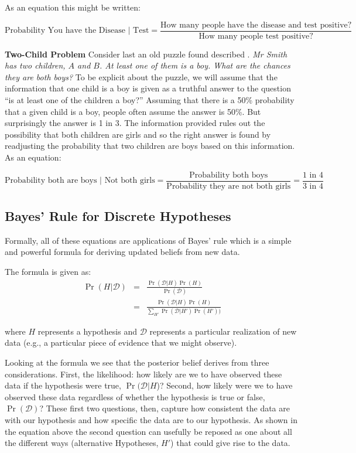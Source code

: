 \documentclass[
  12pt,
]{book}
\begin{document}
As an equation this might be written:

\[\text{Probability You have the Disease | Test} = \frac{\text{How many people have the disease and test positive?}}{\text{How many people test positive?}} \]

\textbf{Two-Child Problem} Consider last an old puzzle found described \citet{gardner1961second}. \emph{Mr Smith has two children, \(A\) and \(B\). At least one of them is a boy. What are the chances they are both boys?}
To be explicit about the puzzle, we will assume that the information that one child is a boy is given as a truthful answer to the question ``is at least one of the children a boy?'' Assuming that there is a 50\% probability that a given child is a boy, people often assume the answer is 50\%. But surprisingly the answer is 1 in 3. The information provided rules out the possibility that both children are girls and so the right answer is found by readjusting the probability that two children are boys based on this information. As an equation:

\[\text{Probability both are boys | Not both girls} = \frac{\text{Probability  both boys}}{\text{Probability they are not both girls}} = \frac{\text{1 in 4}}{\text{3 in 4}}\]

\hypertarget{bayes-rule-for-discrete-hypotheses}{%
\subsection{Bayes' Rule for Discrete Hypotheses}\label{bayes-rule-for-discrete-hypotheses}}

Formally, all of these equations are applications of Bayes' rule which is a simple and powerful formula for deriving updated beliefs from new data.

The formula is given as:
\begin{eqnarray}
\Pr(H|\mathcal{D})&=&\frac{\Pr(\mathcal{D}|H)\Pr(H)}{\Pr(\mathcal{D})}\\
                  &=&\frac{\Pr(\mathcal{D}|H)\Pr(H)}{\sum_{H'}\Pr(\mathcal{D}|H')\Pr(H'))}
\end{eqnarray}

where \(H\) represents a hypothesis and \(\mathcal{D}\) represents a particular realization of new data (e.g., a particular piece of evidence that we might observe).

Looking at the formula we see that the posterior belief derives from three considerations. First, the likelihood: how likely are we to have observed these data if the hypothesis were true, \(\Pr(\mathcal{D}|H\))? Second, how likely were we to have observed these data regardless of whether the hypothesis is true or false, \(\Pr(\mathcal{D})\)? These first two questions, then, capture how consistent the data are with our hypothesis and how specific the data are to our hypothesis. As shown in the equation above the second question can usefully be reposed as one about all the different ways (alternative Hypotheses, \(H'\)) that could give rise to the data.
\end{document}
